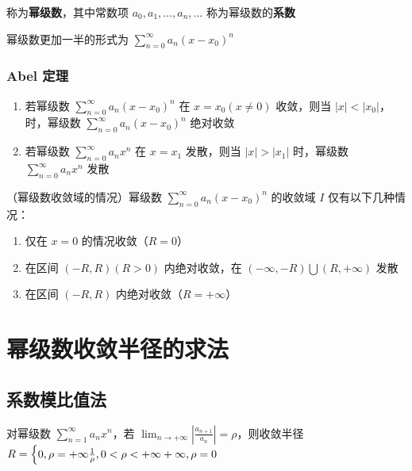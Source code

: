 \documentclass[lang = zh , final , oneside , openany , titlepage , zihao = -4 , linespread = 1.3 , baselineskip = false , cjk-font = windows , text-font = newtx , math-font = newtx , math-style = TeX]{sjtureport}
\begin{document}
称为\textbf{幂级数}，其中常数项 \(a_0,a_1,\ldots,a_n,\ldots\)
称为幂级数的\textbf{系数}

幂级数更加一半的形式为 \(\displaystyle \sum_{n=0}^\infty a_n(x-x_0)^n\)

\subsubsection{Abel 定理}

\begin{enumerate}
\item
  若幂级数 \(\displaystyle \sum_{n=0}^\infty a_n(x-x_0)^n\) 在
  \(x=x_0(x\neq 0)\) 收敛，则当
  \(\vert x \vert <\vert x_0\vert\)，时，幂级数
  \(\displaystyle \sum_{n=0}^\infty a_n(x-x_0)^n\) 绝对收敛
\item
  若幂级数 \(\displaystyle \sum_{n=0}^\infty a_nx^n\) 在 \(x=x_1\)
  发散，则当 \(\vert x \vert >\vert x_1\vert\) 时，幂级数
  \(\displaystyle \sum_{n=0}^\infty a_nx^n\) 发散
\end{enumerate}

\begin{lemma}
    （幂级数收敛域的情况）幂级数 \(\displaystyle \sum_{n=0}^\infty a_n(x-x_0)^n\) 的收敛域 \(I\)
仅有以下几种情况：

\begin{enumerate}
\def\labelenumi{\arabic{enumi}.}
\item
  仅在 \(x=0\) 的情况收敛（\(R=0\)）
\item
  在区间 \((-R,R)(R>0)\) 内绝对收敛，在
  \((-\infty ,-R)\bigcup(R,+\infty)\) 发散
\item
  在区间 \((-R,R)\) 内绝对收敛（\(R=+\infty\)）
\end{enumerate}
\end{lemma}

\section{幂级数收敛半径的求法}

\subsection{系数模比值法}

\begin{theorem}
    对幂级数 \(\displaystyle \sum_{n=1}^\infty a_nx^n\)，若
\(\displaystyle \lim_{n\to+\infty}\left\vert\frac{a_{n+1}}{a_n}\right\vert = \rho\)，则收敛半径
\(\displaystyle R=\begin{cases}0,\rho=+\infty\newline  \frac{1}{\rho}, 0<\rho<+\infty\newline +\infty ,\rho=0\end{cases}\)
\end{theorem}
\end{document}
